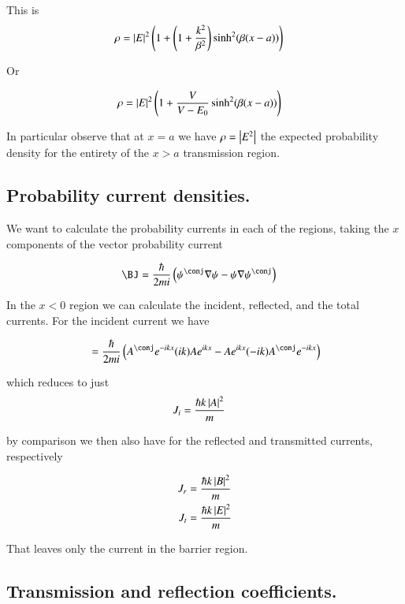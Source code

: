 \documentclass{article}
\begin{document}
This is
\begin{align}
\rho
&= \left\lvert{E}\right\rvert^2 
\left( 1 + \left(1 + \frac{k^2}{\beta^2}\right) \sinh^2( \beta(x-a)) \right) 
\end{align}

Or

\begin{align}
\rho
&= \left\lvert{E}\right\rvert^2 
\left( 1 + \frac{V}{V-E_0} \sinh^2( \beta(x-a)) \right) 
\end{align}

In particular observe that at $x=a$ we have $\rho = \left\lvert{E^2}\right\rvert$ the expected probability density for the entirety 
of the $x>a$ transmission region.

\subsection{ Probability current densities. }

We want to calculate the probability currents in each of the regions, taking the $x$ components of the vector 
probability current

\begin{align}
\BJ
&=
\frac{\hbar}{2 m i}
\left(
\psi^\conj \grad \psi
-\psi \grad \psi^\conj
\right)
\end{align}

In the $x<0$ region we can calculate the incident, reflected, and the total currents.  For the incident current we have

\begin{align*}
&= \frac{\hbar}{2mi}\left( A^\conj e^{-i k x} (ik)A e^{i k x} -Ae^{i k x} (-ik)A^\conj e^{-i k x} \right) \\
\end{align*}

which reduces to just
\begin{align}
J_i &= \frac{\hbar k \left\lvert{A}\right\rvert^2 }{m}
\end{align}

by comparison we then also have for the reflected and transmitted currents, respectively

\begin{align}
J_r &= \frac{\hbar k \left\lvert{B}\right\rvert^2 }{m} \\
J_t &= \frac{\hbar k \left\lvert{E}\right\rvert^2 }{m}
\end{align}

That leaves only the current in the barrier region.

\subsection{ Transmission and reflection coefficients. }
\end{document}
